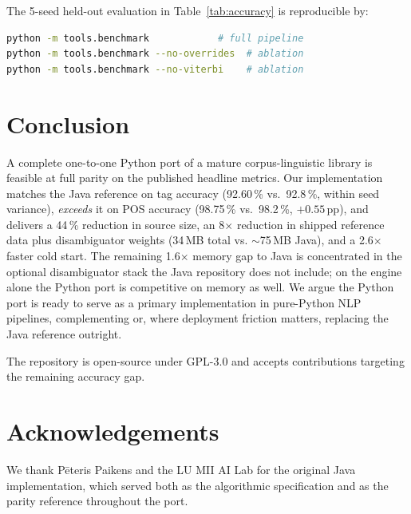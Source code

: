 \documentclass[11pt,a4paper]{article}
\begin{document}
The 5-seed held-out evaluation in Table~\ref{tab:accuracy} is reproducible by:
\begin{lstlisting}[language=bash]
python -m tools.benchmark            # full pipeline
python -m tools.benchmark --no-overrides  # ablation
python -m tools.benchmark --no-viterbi    # ablation
\end{lstlisting}

\section{Conclusion}

A complete one-to-one Python port of a mature corpus-linguistic library is
feasible at full parity on the published headline metrics. Our implementation
matches the Java reference on tag accuracy
(92.60\,\% vs.\ 92.8\,\%, within seed variance), \emph{exceeds} it on POS
accuracy (98.75\,\% vs.\ 98.2\,\%, $+0.55$\,pp), and delivers a
44\,\% reduction in source size, an 8$\times$ reduction in shipped reference
data plus disambiguator weights (34\,MB total vs. $\sim$75\,MB Java), and a
2.6$\times$ faster cold start. The remaining 1.6$\times$ memory gap to Java
is concentrated in the optional disambiguator stack the Java repository
does not include; on the engine alone the Python port is competitive on
memory as well. We argue the Python port is ready to serve as a primary
implementation in pure-Python NLP pipelines, complementing or, where
deployment friction matters, replacing the Java reference outright.

The repository is open-source under GPL-3.0 and accepts contributions
targeting the remaining accuracy gap.

\section*{Acknowledgements}

We thank Pēteris Paikens and the LU MII AI Lab for the original Java
implementation, which served both as the algorithmic specification and as
the parity reference throughout the port.
\end{document}

